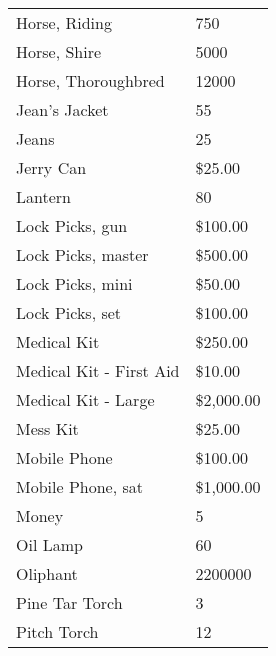 \documentclass[twoside]{book}
\begin{document}
\begin{longtable}{p{1.25in}l}
  \raggedright
           Horse, Riding 
  &
   750 
  \tabularnewline
      
  \raggedright
           Horse, Shire 
  &
   5000 
  \tabularnewline
      
  \raggedright
           Horse, Thoroughbred 
  &
   12000 
  \tabularnewline
      
  \raggedright
           Jean's Jacket 
  &
   55 
  \tabularnewline
      
  \raggedright
           Jeans 
  &
   25 
  \tabularnewline
      
  \raggedright
           Jerry Can 
  &
   \$25.00 
  \tabularnewline
      
  \raggedright
           Lantern 
  &
   80 
  \tabularnewline
      
  \raggedright
           Lock Picks, gun 
  &
   \$100.00 
  \tabularnewline
      
  \raggedright
           Lock Picks, master 
  &
   \$500.00 
  \tabularnewline
      
  \raggedright
           Lock Picks, mini 
  &
   \$50.00 
  \tabularnewline
      
  \raggedright
           Lock Picks, set 
  &
   \$100.00 
  \tabularnewline
      
  \raggedright
           Medical Kit 
  &
   \$250.00 
  \tabularnewline
      
  \raggedright
           Medical Kit - First Aid
           
  &
   \$10.00 
  \tabularnewline
      
  \raggedright
           Medical Kit - Large 
  &
   \$2,000.00 
  \tabularnewline
      
  \raggedright
           Mess Kit 
  &
   \$25.00 
  \tabularnewline
      
  \raggedright
           Mobile Phone 
  &
   \$100.00 
  \tabularnewline
      
  \raggedright
           Mobile Phone, sat 
  &
   \$1,000.00 
  \tabularnewline
      
  \raggedright
           Money 
  &
   5 
  \tabularnewline
      
  \raggedright
           Oil Lamp 
  &
   60 
  \tabularnewline
      
  \raggedright
           Oliphant 
  &
   2200000 
  \tabularnewline
      
  \raggedright
           Pine Tar Torch 
  &
   3 
  \tabularnewline
      
  \raggedright
           Pitch Torch 
  &
   12 
  \tabularnewline
      

\end{longtable}
\end{document}
